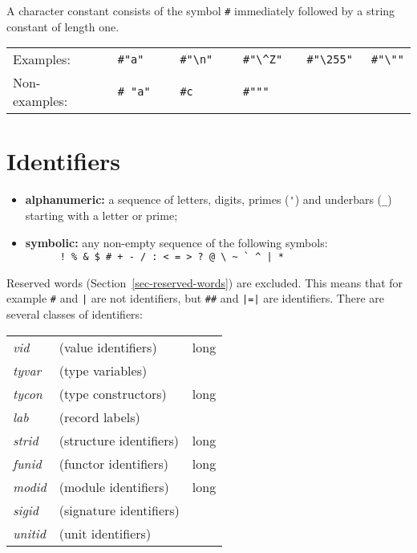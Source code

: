\documentclass[fleqn]{article}
\begin{document}
A character constant consists of the symbol \verb$#$ immediately
followed by a string constant of length one.

\begin{quot}
\begin{tabular}{@{}lclllll}
Examples:   & &  \verb$#"a"    $ & \verb$#"\n"   $ & \verb$#"\^Z"  $ &
\verb$#"\255" $ & \verb$#"\""$\\
Non-examples: & & \verb$# "a"$ & \verb$#c$ & \verb$#"""$ 
\end{tabular}
\end{quot}


\section{Identifiers}
\label{sec-identifiers}

\begin{itemize}
\item {\bf alphanumeric:} a sequence of letters, digits, primes
  (\verb#'#) and underbars (\verb#_#) starting with a letter or prime;

\item {\bf symbolic:} any non-empty sequence of the following symbols:\\
\verb;      ! % & $ # + - / : < = > ? @ \ ~ ` ^ | *;
\end{itemize}

\noindent Reserved words (Section~\ref{sec-reserved-words}) are
excluded.  This means that for example \verb$#$ and \verb#|# are not
identifiers, but \verb$##$ and \verb#|=|# are identifiers.  There are
several classes of identifiers:

{\begin{center}
\begin{tabular}{@{}lll}
{\it vid }  &  (value identifiers)           &    long\\
{\it tyvar} &  (type variables)\\
{\it tycon} &  (type constructors)         &    long\\
{\it lab}   &  (record labels)\\
{\it strid} &  (structure identifiers)         &    long\\
{\it funid} &  (functor identifiers)         &    long\\
{\it modid} &  (module identifiers)         &    long\\
{\it sigid} &  (signature identifiers)\\
{\it unitid} &  (unit identifiers)
\end{tabular}
\end{center}}
\end{document}
